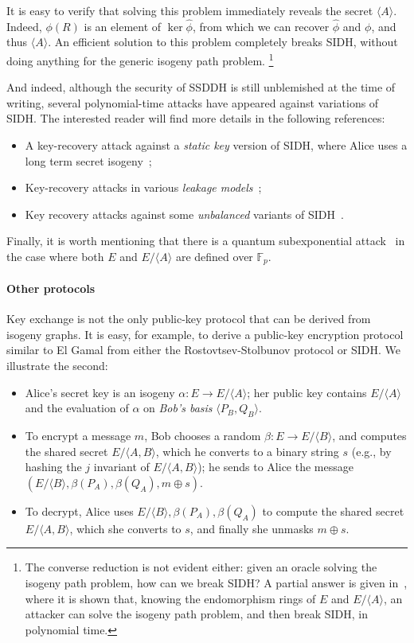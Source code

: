 \documentclass[10pt]{article}
\theoremstyle{plain}
\theoremstyle{definition}
\def\F{\ensuremath{\mathbb{F}}}
\begin{document}
It is easy to verify that solving this problem immediately reveals the
secret $〈A〉$. Indeed, $ϕ(R)$ is an element of $\ker\hat{ϕ}$, from
which we can recover $\hat{ϕ}$ and $ϕ$, and thus $〈A〉$. %
An efficient solution to this problem completely breaks SIDH, without
doing anything for the generic isogeny path problem.%
\footnote{The converse reduction is not evident either: given an
  oracle solving the isogeny path problem, how can we break SIDH? %
  A partial answer is given
  in~\cite{kohel2014quaternion,galbraithsecurity}, where it is shown
  that, knowing the endomorphism rings of $E$ and $E/〈A〉$, an
  attacker can solve the isogeny path problem, and then break SIDH, in
  polynomial time.}

And indeed, although the security of SSDDH is still unblemished at the
time of writing, several polynomial-time attacks have appeared against
variations of SIDH. %
The interested reader will find more details in the following
references:
\begin{itemize}
\item A key-recovery attack against a \emph{static key} version of
  SIDH, where Alice uses a long term secret
  isogeny~\cite{galbraithsecurity};
\item Key-recovery attacks in various \emph{leakage
    models}~\cite{galbraithsecurity,gelin2017loop,ti2017fault};
\item Key recovery attacks against some \emph{unbalanced} variants
  of SIDH~\cite{cryptoeprint:2017:571}.
\end{itemize}
Finally, it is worth mentioning that there is a quantum subexponential
attack~\cite{biasse2014quantum} in the case where both $E$ and
$E/〈A〉$ are defined over $\F_p$.


\paragraph{Other protocols}
Key exchange is not the only public-key protocol that can be derived
from isogeny graphs. %
It is easy, for example, to derive a public-key encryption protocol
similar to El Gamal from either the Rostovtsev-Stolbunov protocol or
SIDH. %
We illustrate the second:
\begin{itemize}
\item Alice's secret key is an isogeny $α:E\to E/〈A〉$; her public
  key contains $E/〈A〉$ and the evaluation of $α$ on \emph{Bob's
    basis} $〈P_B,Q_B〉$.
\item To encrypt a message $m$, Bob chooses a random $β:E\to E/〈B〉$,
  and computes the shared secret $E/〈A,B〉$, which he converts to a
  binary string $s$ (e.g., by hashing the $j$ invariant of
  $E/〈A,B〉$); he sends to Alice the message
  $(E/〈B〉,β(P_A),β(Q_A),m⊕s)$.
\item To decrypt, Alice uses $E/〈B〉,β(P_A),β(Q_A)$ to compute the
  shared secret $E/〈A,B〉$, which she converts to $s$, and finally
  she unmasks $m⊕s$.
\end{itemize}
\end{document}
